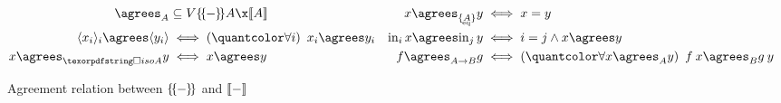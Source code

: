\begin{figure*}
  \begin{align*}
    {\agrees_A} &\subseteq \vals{\incdens{A}} \x \den{A} &
    x \agrees_{\tseteq A} y &\iff x = y\\
    \tuple{x_i}_i \agrees \tuple{y_i} &\iff \fa{i} x_i \agrees y_i &
    \inj i x \agrees \inj j y &\iff i = j \wedge x \agrees y\\
    x \agrees_{\isof A} y &\iff x \agrees y &
    f \agrees_{A \to B} g &\iff \fa{x \agrees_A y} f\<x \agrees_B g\<y
  \end{align*}


  \caption{Agreement relation between $\{\kern-.18em\{\kern-.05em{-}\kern-.05em\}\kern -.18em\}$ and $\llbracket{-}\rrbracket$}
  \label{fig:agrees}
\end{figure*}
